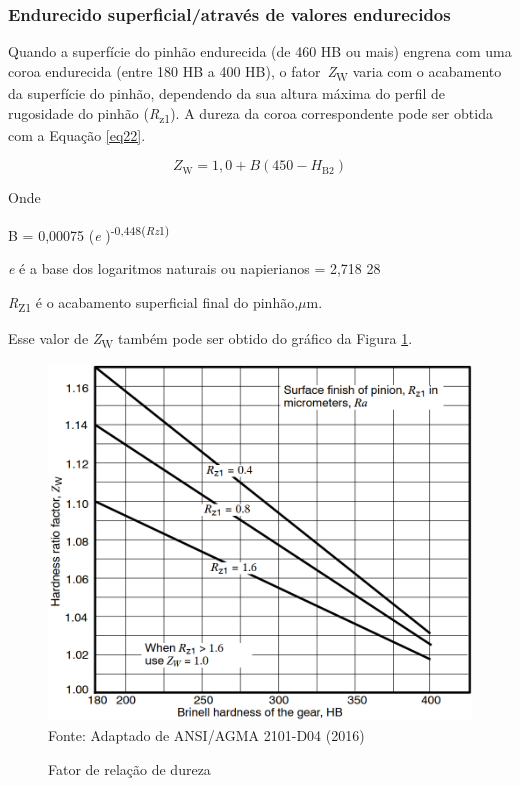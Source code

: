 \documentclass[12pt,a4paper]{article}
\begin{document}
\subsubsection*{Endurecido superficial/através de valores
endurecidos}

{\label{endurecido-superficialatravuxe9s-de-valores-endurecidos}}

Quando a superfície do pinhão endurecida (de 460 HB ou mais) engrena com
uma coroa endurecida (entre 180 HB a 400 HB), o
fator~\emph{Z}\textsubscript{W} varia com o acabamento da superfície do
pinhão, dependendo da sua altura máxima do perfil de rugosidade do
pinhão (\emph{R}\textsubscript{z1}). A dureza da coroa correspondente
pode ser obtida com a Equação {\ref{eq22}}.

\par\null

\begin{equation}
\label{eq22}
Z_{\mathrm{W}}\mathrm{=1,0+}B\left(\mathrm{450-}H_{\mathrm{B2}}\right)
\end{equation}

\par\null

Onde

B = 0,00075 (\emph{e} )\textsuperscript{-0,448(\emph{Rz}1)}

\emph{e} é a base dos logaritmos naturais ou napierianos = 2,718 28

\emph{R}\textsubscript{Z1} é o acabamento superficial final do pinhão,$\mu$m.

Esse valor de \emph{Z}\textsubscript{W} também pode ser obtido do
gráfico da Figura {\ref{fig:18}}.

\begin{figure}[!htb]
    \centering
    \caption{Fator de relação de dureza}
    \includegraphics[scale=0.5]{Imagens/Img18.png}\\
    {\footnotesize Fonte: Adaptado de ANSI/AGMA 2101-D04 (2016)}
    \label{fig:18}
\end{figure}
\end{document}
